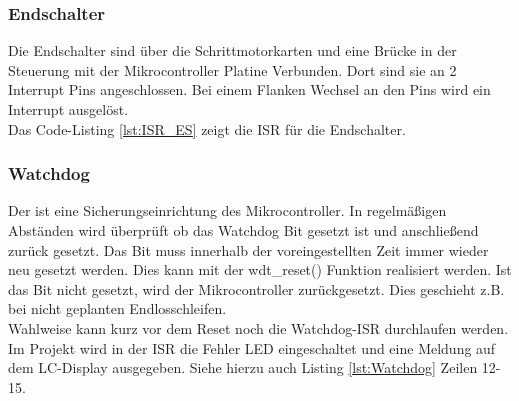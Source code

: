 \subsubsection{Endschalter}
Die Endschalter sind über die Schrittmotorkarten und eine Brücke in der Steuerung mit der Mikrocontroller Platine Verbunden. Dort sind sie an 2 Interrupt Pins angeschlossen.  Bei einem Flanken Wechsel an den Pins wird ein Interrupt ausgelöst. \\
Das Code-Listing \ref{lst:ISR_ES} zeigt die ISR für die Endschalter.
\lstset{language=C, basicstyle=\footnotesize, showstringspaces=false, tabsize=2}

\subsubsection{Watchdog}
Der  ist eine Sicherungseinrichtung des Mikrocontroller. In regelmäßigen Abständen wird überprüft ob das Watchdog Bit gesetzt ist und anschließend zurück gesetzt. Das Bit muss innerhalb der voreingestellten Zeit immer wieder neu gesetzt werden. Dies kann mit der wdt\_reset() Funktion realisiert werden. Ist das Bit nicht gesetzt, wird der Mikrocontroller zurückgesetzt.  Dies geschieht z.B. bei nicht geplanten Endlosschleifen.\\
Wahlweise kann kurz vor dem Reset noch die Watchdog-ISR durchlaufen werden.\\
Im Projekt wird in der ISR die Fehler LED eingeschaltet und eine Meldung auf dem LC-Display ausgegeben. Siehe hierzu auch Listing \ref{lst:Watchdog} Zeilen 12-15.
\lstset{language=C, basicstyle=\footnotesize, showstringspaces=false, tabsize=4}

